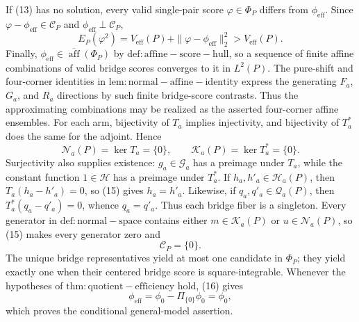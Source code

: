 If (13) has no solution, every valid single-pair score \(\varphi\in\Phi_P\) differs from \(\phi_{\mathrm{eff}}\).  Since \(\varphi-\phi_{\mathrm{eff}}\in\mathcal C_P\) and \(\phi_{\mathrm{eff}}\perp\mathcal C_P\),
\[
 E_P(\varphi^2)
 =V_{\mathrm{eff}}(P)+\|\varphi-\phi_{\mathrm{eff}}\|_2^2
 >V_{\mathrm{eff}}(P).                                             \tag{14}
\]
Finally, \(\phi_{\mathrm{eff}}\in\overline{\operatorname{aff}}(\Phi_P)\) by \(\mathrm{def:affine-score-hull}\), so a sequence of finite affine combinations of valid bridge scores converges to it in \(L^2(P)\).  The pure-shift and four-corner identities in \(\mathrm{lem:normal-affine-identity}\) express the generating \(F_a\), \(G_a\), and \(R_a\) directions by such finite bridge-score contrasts.  Thus the approximating combinations may be realized as the asserted four-corner affine ensembles.
For each arm, bijectivity of \(T_a\) implies injectivity, and bijectivity of \(T_a^*\) does the same for the adjoint.  Hence
\[
 \mathcal N_a(P)=\ker T_a=\{0\},
 \qquad
 \mathcal K_a(P)=\ker T_a^*=\{0\}.                                \tag{15}
\]
Surjectivity also supplies existence: \(g_a\in\mathcal G_a\) has a preimage under \(T_a\), while the constant function \(1\in\mathcal H\) has a preimage under \(T_a^*\).  If \(h_a,h'_a\in\mathcal H_a(P)\), then \(T_a(h_a-h'_a)=0\), so (15) gives \(h_a=h'_a\).  Likewise, if \(q_a,q'_a\in\mathcal Q_a(P)\), then \(T_a^*(q_a-q'_a)=0\), whence \(q_a=q'_a\).  Thus each bridge fiber is a singleton.  Every generator in \(\mathrm{def:normal-space}\) contains either \(m\in\mathcal K_a(P)\) or \(u\in\mathcal N_a(P)\), so (15) makes every generator zero and
\[
 \mathcal C_P=\{0\}.                                                \tag{16}
\]
The unique bridge representatives yield at most one candidate in \(\Phi_P\); they yield exactly one when their centered bridge score is square-integrable.  Whenever the hypotheses of \(\mathrm{thm:quotient-efficiency}\) hold, (16) gives
\[
 \phi_{\mathrm{eff}}
 =\phi_0-\Pi_{\{0\}}\phi_0=\phi_0,
\]
which proves the conditional general-model assertion.

